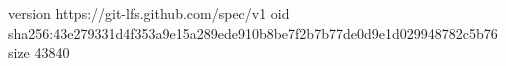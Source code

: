 version https://git-lfs.github.com/spec/v1
oid sha256:43e279331d4f353a9e15a289ede910b8be7f2b7b77de0d9e1d029948782c5b76
size 43840
